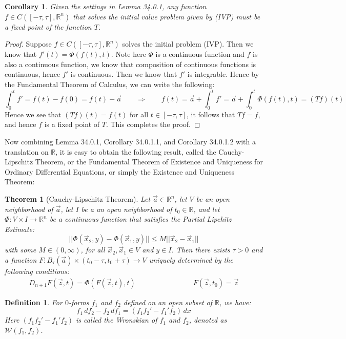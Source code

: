 \documentclass[11pt,oneside]{book}
\theoremstyle{break}
\theoremstyle{break}
\newtheorem{thm}{Theorem}[section]
\newtheorem{corL}{Corollary}[lem]
\newtheorem{defn}{Definition}[corL]
\newcommand{\R}{\mathbb{R}}
\begin{document}
\begin{corL}
Given the settings in Lemma 34.0.1, any function $f \in C([-\tau,\tau],\R^n)$ that solves the initial value problem given by (IVP) must be a fixed point of the function $T$.
\end{corL} 
\begin{proof}
Suppose $f\in C([-\tau,\tau],\R^n)$ solves the initial problem (IVP). Then we know that $f'(t) = \Phi(f(t),t)$. Note here $\Phi$ is a continuous function and $f$ is also a continuous function, we know that composition of continuous functions is continuous, hence $f'$ is continuous. Then we know that $f'$ is integrable. Hence by the Fundamental Theorem of Calculus, we can write the following:
$$\int_0^t f' = f(t) - f(0) =f(t) - \vec{a} \qquad \Rightarrow \qquad f(t) = \vec{a}+ \int_0^t f' = \vec{a}+ \int_0^t \Phi(f(t),t) = (Tf)(t)$$
Hence we see that $(Tf)(t) = f(t)$ for all $t \in [-\tau,\tau]$, it follows that $Tf = f$, and hence $f$ is a fixed point of $T$. This completes the proof.
\end{proof}

Now combining Lemma 34.0.1, Corollary 34.0.1.1, and Corollary 34.0.1.2 with a translation on $\R$, it is easy to obtain the following result, called the Cauchy-Lipschitz Theorem, or the Fundamental Theorem of Existence and Uniqueness for Ordinary Differential Equations, or simply the Existence and Uniqueness Theorem:
\begin{thm}[Cauchy-Lipschitz Theorem]
Let $\vec{a}\in \R^n$, let $V$ be an open neighborhood of $\vec{a}$, let $I$ be a an open neighborhood of $t_0 \in \R$, and let $\Phi:V \times I \to \R^n$ be a continuous function that satisfies the Partial Lipchitz Estimate:
$$||\Phi(\vec{x}_2, y) - \Phi(\vec{x}_1,y)|| \leq M||\vec{x}_2-\vec{x}_1||$$
with some $M \in (0,\infty)$, for all $\vec{x}_2,\vec{x}_1 \in V$ and $y \in I$. Then there exists $\tau >0$ and a function $F:B_{\tau}(\vec{a}) \times (t_0 - \tau, t_0 + \tau) \to V$ uniquely determined by the following conditions:
\begin{align*}
D_{n+1}F(\vec{z},t) = \Phi(F(\vec{z},t),t) \qquad\qquad\qquad\qquad F(\vec{z},t_0) = \vec{z}
\end{align*}
\end{thm}

\hfill\break
\hfill\break
\begin{defn}
For $0$-forms $f_1$ and $f_2$ defined on an open subset of $\R$, we have:
$$f_1\, df_2 - f_2\, df_1 = (f_1f_2' - f_1' f_2) \, dx$$ 
Here $(f_1f_2' - f_1' f_2)$ is called the Wronskian of $f_1$ and $f_2$, denoted as $\mathcal{W}(f_1,f_2)$.
\end{defn}
\end{document}

